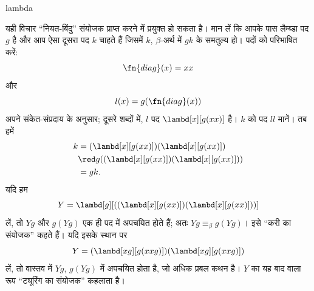 \documentclass[../../../include/open-logic-section]{subfiles}
\begin{document}
\begin{tagblock}{lambda}
\begin{digress}
यही विचार ``नियत-बिंदु'' संयोजक प्राप्त करने में प्रयुक्त हो सकता है।
मान लें कि आपके पास लैम्ब्डा पद $g$ है और आप ऐसा दूसरा पद $k$ चाहते हैं
जिसमें $k$, $\beta$-अर्थ में $gk$ के समतुल्य हो। पदों को परिभाषित करें:
\[
\fn{diag}(x) = xx
\]
और
\[
l(x) = g(\fn{diag}(x))
\]
अपने संकेत-संप्रदाय के अनुसार; दूसरे शब्दों में, $l$ पद
$\lambd[x][g(xx)]$ है। $k$ को पद $ll$ मानें। तब हमें
\begin{align*}
k & = (\lambd[x][g(xx)])(\lambd[x][g(xx)]) \\
& \red  g((\lambd[x][g(xx)])(\lambd[x][g(xx)])) \\
& = gk.
\end{align*}
यदि हम
\[
Y = \lambd[g][((\lambd[x][g(xx)])(\lambd[x][g(xx)]))]
\]
लें, तो $Yg$ और $g(Yg)$ एक ही पद में अपचयित होते हैं; अतः
$Yg \equiv_\beta
g(Yg)$। इसे ``करी का संयोजक'' कहते हैं। यदि इसके स्थान पर
\[
Y = (\lambd[xg][g(xxg)])(\lambd[xg][g(xxg)])
\]
लें, तो वास्तव में $Yg$, $g(Yg)$ में अपचयित होता है, जो अधिक प्रबल कथन
है। $Y$ का यह बाद वाला रूप ``ट्यूरिंग का संयोजक'' कहलाता है।
\end{digress}
\end{tagblock}
\end{document}
